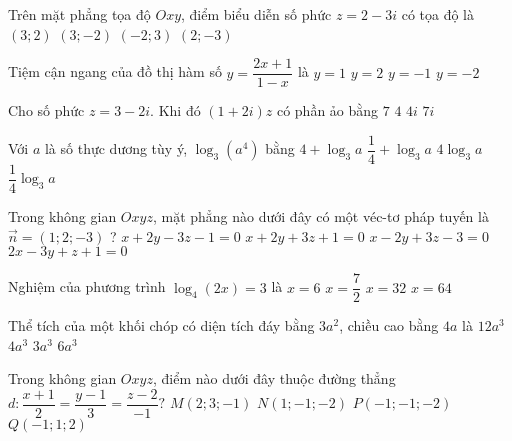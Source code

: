 \begin{ex}%
Trên mặt phẳng tọa độ $Oxy$, điểm biểu diễn số phức $z=2-3 i$ có tọa độ là
\choice
{$(3 ; 2)$}
{$(3 ;-2)$}
{$(-2 ; 3)$}
{\True $(2 ;-3)$}
\end{ex}
\begin{ex}%
Tiệm cận ngang của đồ thị hàm số $y=\dfrac{2 x+1}{1-x}$ là
\choice
{ $y=1$}
{$y=2$}
{$y=-1$}
{\True $y=-2$}
\end{ex}
\begin{ex}%
Cho số phức $z=3-2i$. Khi đó $(1+2i)z$ có phần ảo bằng
\choice
{$7$}
{$4$}
{\True $4i$}
{$7i$}
\end{ex}
\begin{ex}%
Với $a$ là số thực dương tùy ý, $\log _3\left(a^4\right)$ bằng
\choice
{$4+\log _3 a$}
{$\dfrac{1}{4}+\log _3 a$}
{\True $4 \log _3 a$}
{$\dfrac{1}{4} \log _3 a$}
\end{ex}
\begin{ex}%
Trong không gian $Oxyz$, mặt phẳng nào dưới đây có một véc-tơ pháp tuyến là $\vec{n}=(1 ; 2 ;-3)$ ?
\choice
{\True $x+2y-3z-1=0$}
{$x+2y+3z+1=0$}
{$x-2y+3z-3=0$}
{$2x-3y+z+1=0$}
\end{ex}
\begin{ex}%
Nghiệm của phương trình $\log _4(2 x)=3$ là
\choice
{$x=6$}
{$x=\dfrac{7}{2}$}
{\True $x=32$}
{$x=64$}
\end{ex}
\begin{ex}%
	Thể tích của một khối chóp có diện tích đáy bằng $3a^2$, chiều cao bằng $4a$ là
	\choice
	{ $12 a^3$}
	{\True $4 a^3$}
	{$3 a^3$}
	{$6 a^3$}
\end{ex}
\begin{ex}%
	Trong không gian $O x y z$, điểm nào dưới đây thuộc đường thẳng $d: \dfrac{x+1}{2}=\dfrac{y-1}{3}=\dfrac{z-2}{-1} ?$
	\choice
	{$M(2 ; 3 ;-1)$}
	{$N(1 ;-1 ;-2)$}
	{$P(-1 ;-1 ;-2)$}
	{\True $Q(-1 ; 1 ; 2)$}
\end{ex}
